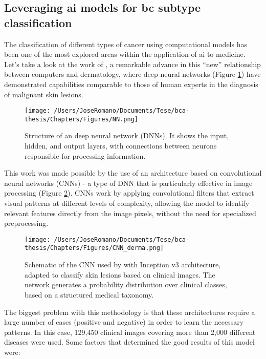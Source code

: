 \subsection{Leveraging \gls{ai} models for \gls{bc} subtype classification}

The classification of different types of cancer using computational models has
been one of the most explored areas within the application of \gls{ai} to
medicine. Let's take a look at the work of
\textcite{ai_in_dermacancer_esteva2017}, a remarkable advance in this “new”
relationship between computers and dermatology, where deep neural networks
(Figure \ref{fig:DNN}) have demonstrated capabilities comparable to those of
human experts in the diagnosis of malignant skin lesions.

\begin{figure}[htbp]
  \centering
  \texttt{[image: /Users/JoseRomano/Documents/Tese/bca-thesis/Chapters/Figures/NN.png]}
  \caption{Structure of an deep neural network (DNNs). It shows the input, hidden, and output layers, with connections between neurons responsible for processing information.}
  \label{fig:DNN}
\end{figure}

This work was made possible by the use of an architecture based on
convolutional neural networks (CNNs) - a type of DNN that is particularly
effective in image processing (Figure \ref{fig:CNN_derma}). CNNs work by
applying convolutional filters that extract visual patterns at different levels
of complexity, allowing the model to identify relevant features directly from
the image pixels, without the need for specialized preprocessing.

\begin{figure}[htbp]
  \centering
  \texttt{[image: /Users/JoseRomano/Documents/Tese/bca-thesis/Chapters/Figures/CNN\_derma.png]}
  \caption{Schematic of the CNN used by \textcite{ai_in_dermacancer_esteva2017} with Inception v3 architecture, adapted to classify skin lesions based on clinical images. The network generates a probability distribution over clinical classes, based on a structured medical taxonomy.}
  \label{fig:CNN_derma}
\end{figure}

The biggest problem with this methodology is that these architectures require a
large number of cases (positive and negative) in order to learn the necessary
patterns. In this case, 129{,}450 clinical images covering more than 2{,}000
different diseases were used. Some factors that determined the good results of
this model were:

